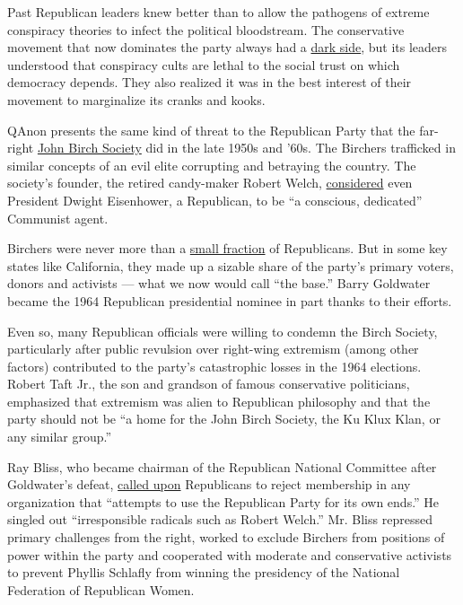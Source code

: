 Past Republican leaders knew better than to allow the pathogens of
extreme conspiracy theories to infect the political bloodstream. The
conservative movement that now dominates the party always had a
\href{https://www.nytimes3xbfgragh.onion/2017/04/11/magazine/i-thought-i-understood-the-american-right-trump-proved-me-wrong.html}{dark
side}, but its leaders understood that conspiracy cults are lethal to
the social trust on which democracy depends. They also realized it was
in the best interest of their movement to marginalize its cranks and
kooks.

QAnon presents the same kind of threat to the Republican Party that the
far-right
\href{https://www.newyorker.com/magazine/2016/01/11/a-view-from-the-fringe}{John
Birch Society} did in the late 1950s and '60s. The Birchers trafficked
in similar concepts of an evil elite corrupting and betraying the
country. The society's founder, the retired candy-maker Robert Welch,
\href{https://www.politico.com/magazine/story/2017/07/16/the-john-birch-society-is-alive-and-well-in-the-lone-star-state-215377}{considered}
even President Dwight Eisenhower, a Republican, to be ``a conscious,
dedicated'' Communist agent.

Birchers were never more than a
\href{https://www.splcenter.org/fighting-hate/intelligence-report/2013/bringing-back-birch}{small
fraction} of Republicans. But in some key states like California, they
made up a sizable share of the party's primary voters, donors and
activists --- what we now would call ``the base.'' Barry Goldwater
became the 1964 Republican presidential nominee in part thanks to their
efforts.

Even so, many Republican officials were willing to condemn the Birch
Society, particularly after public revulsion over right-wing extremism
(among other factors) contributed to the party's catastrophic losses in
the 1964 elections. Robert Taft Jr., the son and grandson of famous
conservative politicians, emphasized that extremism was alien to
Republican philosophy and that the party should not be ``a home for the
John Birch Society, the Ku Klux Klan, or any similar group.''

Ray Bliss, who became chairman of the Republican National Committee
after Goldwater's defeat,
\href{https://www.beaconjournal.com/article/20130201/OPINION/302019041}{called
upon} Republicans to reject membership in any organization that
``attempts to use the Republican Party for its own ends.'' He singled
out ``irresponsible radicals such as Robert Welch.'' Mr. Bliss repressed
primary challenges from the right, worked to exclude Birchers from
positions of power within the party and cooperated with moderate and
conservative activists to prevent Phyllis Schlafly from winning the
presidency of the National Federation of Republican Women.

